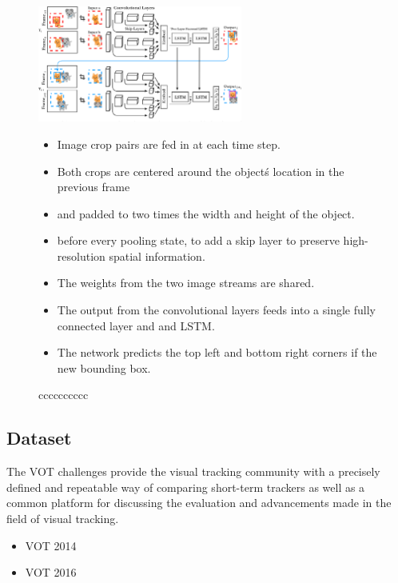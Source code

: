\documentclass[a4paper]{article}
\begin{document}
\begin{figure}[hb]
    \centering
    \includegraphics[width=0.6\textwidth]{figures/pipeline-re3.png}
    \caption{
            cccccccccc
    }
    \label{fig:re3}
    \medskip
    \small 
        \begin{itemize}
        \item Image crop pairs are fed in at each time step.
        \item Both crops are centered around the object\'s location in the previous frame 
        \item and padded to two times the width and height of the object. 
        \item before every pooling state, to add a skip layer to preserve high-resolution spatial information.
        \item The weights from the two image streams are shared.
        \item The output from the convolutional layers feeds into a single fully connected layer and  and LSTM.
        \item The network predicts the top left and bottom right corners if the new bounding box.  
        \end{itemize}
\end{figure}


\subsection{Dataset}

The VOT challenges provide the visual tracking community with a precisely defined and repeatable way of comparing short-term trackers as well as a common platform for discussing the evaluation and advancements made in the field of visual tracking.
\cite{VOT2014} \cite{VOT2016}
\begin{itemize}
    \item VOT 2014
    \item VOT 2016
\end{itemize}
\end{document}
